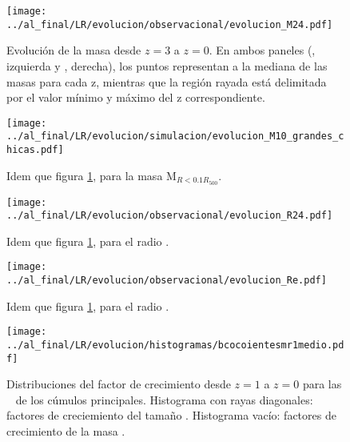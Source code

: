 \begin{figure}[H]
 \centering
 \texttt{[image: ../al\_final/LR/evolucion/observacional/evolucion\_M24.pdf]}
\caption{Evoluci\'on de la masa \mvc desde $z=3$ a $z=0$. En ambos paneles (\cmay, izquierda y \cmen, derecha), los puntos representan
a la mediana de las masas para cada z, mientras
que la regi\'on rayada est\'a delimitada por el valor m\'inimo y m\'aximo del z correspondiente. 
}
\label{fig:evolmbcg}
\end{figure}

\begin{figure}[H]
 \centering
 \texttt{[image: ../al\_final/LR/evolucion/simulacion/evolucion\_M10\_grandes\_chicas.pdf]}
\caption{Idem que figura \ref{fig:evolmbcg}, para la masa M$_{R<0.1R_{500}}$.}
\label{fig:evolm10}
\end{figure}


\begin{figure}[H]
 \centering
 \texttt{[image: ../al\_final/LR/evolucion/observacional/evolucion\_R24.pdf]}
\caption{Idem que figura \ref{fig:evolmbcg}, para el radio \rvc.}
\label{fig:evolr24}
\end{figure}

\begin{figure}[H]
 \centering
 \texttt{[image: ../al\_final/LR/evolucion/observacional/evolucion\_Re.pdf]}
\caption{Idem que figura \ref{fig:evolmbcg}, para el radio \rum.}
\label{fig:evolrum}
\end{figure}

\begin{figure}[H]
 \centering
 \texttt{[image: ../al\_final/LR/evolucion/histogramas/bcocoientesmr1medio.pdf]}
\caption{Distribuciones del factor de crecimiento desde $z=1$ a $z=0$ 
para las \bcgs~ de los c\'umulos principales. Histograma con rayas diagonales: factores de creciemiento del tama\~no \rum.
Histograma vac\'io: factores de crecimiento de la masa \mvc.}
\label{fig:factores}
\end{figure}



